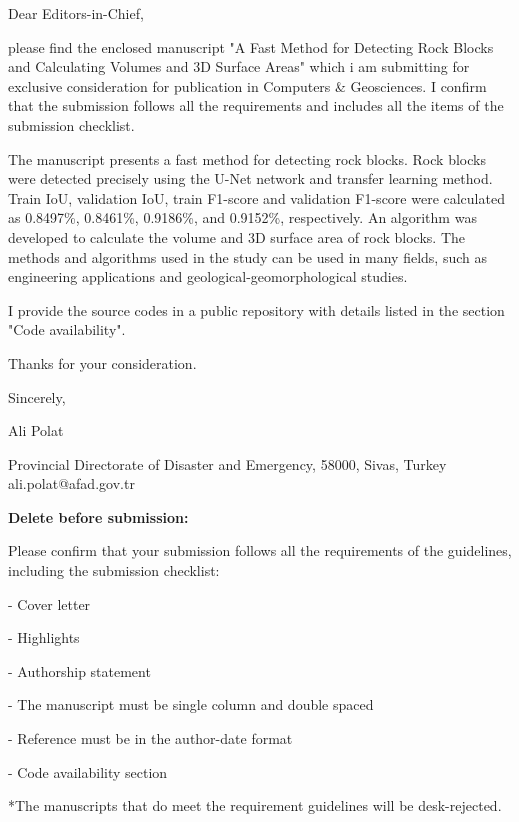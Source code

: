 \documentclass[a4paper,fleqn]{cas-sc}
\begin{document}
\begin{coverletter}

Dear Editors-in-Chief,
\newline
 
please find the enclosed manuscript "A Fast Method for Detecting Rock Blocks and Calculating Volumes and 3D Surface Areas" which i am submitting for exclusive consideration for publication in Computers \& Geosciences. I confirm that the submission follows all the requirements and includes all the items of the submission checklist.  
\newline
 
The manuscript presents a fast method for detecting rock blocks. Rock blocks were detected precisely using the U-Net network and transfer learning method. Train IoU, validation IoU, train F1-score and validation F1-score were calculated as 0.8497\%, 0.8461\%, 0.9186\%, and 0.9152\%, respectively. An algorithm was developed to calculate the volume and 3D surface area of rock blocks. The methods and algorithms used in the study can be used in many fields, such as engineering applications and geological-geomorphological studies.
\newline

I provide the source codes in a public repository with details listed in the section "Code availability".
\newline

Thanks for your consideration. 
\newline

Sincerely,
\newline

Ali Polat

Provincial Directorate of Disaster and Emergency, 58000, Sivas, Turkey ali.polat@afad.gov.tr
\newline

\textbf{Delete before submission:}

Please confirm that your submission follows all the requirements of the guidelines, including the submission checklist:

- Cover letter

- Highlights

- Authorship statement

- The manuscript must be single column and double spaced

- Reference must be in the author-date format

- Code availability section 

*The manuscripts that do meet the requirement guidelines will be desk-rejected.



\end{coverletter}
\end{document}
